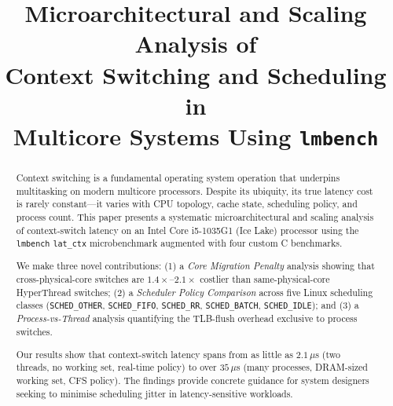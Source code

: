 \documentclass[conference]{IEEEtran}
\begin{document}

\title{Microarchitectural and Scaling Analysis of\\
       Context Switching and Scheduling in\\
       Multicore Systems Using \texttt{lmbench}}

\author{
}

\maketitle

\begin{abstract}
Context switching is a fundamental operating system operation that
underpins multitasking on modern multicore processors.  Despite its
ubiquity, its true latency cost is rarely constant—it varies with
CPU topology, cache state, scheduling policy, and process count.
This paper presents a systematic microarchitectural and scaling
analysis of context-switch latency on an Intel Core i5-1035G1 (Ice Lake)
processor using the \texttt{lmbench} \texttt{lat\_ctx} microbenchmark
augmented with four custom C benchmarks.

We make three novel contributions: (1) a \emph{Core Migration Penalty} analysis showing that
cross-physical-core switches are $1.4\times$–$2.1\times$ costlier than same-physical-core
HyperThread switches; (2) a \emph{Scheduler Policy Comparison} across
five Linux scheduling classes (\texttt{SCHED\_OTHER}, \texttt{SCHED\_FIFO},
\texttt{SCHED\_RR}, \texttt{SCHED\_BATCH}, \texttt{SCHED\_IDLE});
and (3) a \emph{Process-vs-Thread} analysis quantifying the TLB-flush
overhead exclusive to process switches.

Our results show that context-switch latency spans from as little as
$2.1\,\mu$s (two threads, no working set, real-time policy) to over
$35\,\mu$s (many processes, DRAM-sized working set, CFS policy).
The findings provide concrete guidance for system designers seeking
to minimise scheduling jitter in latency-sensitive workloads.
\end{abstract}
\end{document}

